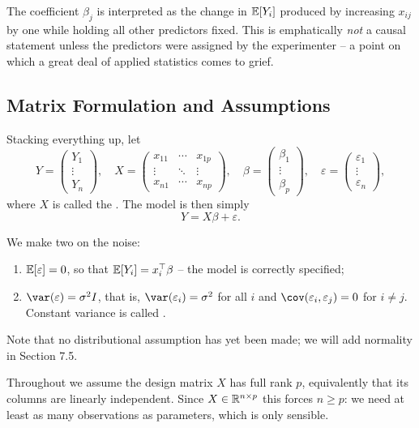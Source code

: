 \documentclass[a4paper]{scrartcl}
\begin{document}
The coefficient $\beta_j$ is interpreted as the change in $\mathbb{E}[Y_i]$ produced by increasing $x_{ij}$ by one while holding all other predictors fixed. This is emphatically \emph{not} a causal statement unless the predictors were assigned by the experimenter -- a point on which a great deal of applied statistics comes to grief.

\subsection{Matrix Formulation and Assumptions}

Stacking everything up, let
$$
Y = \begin{pmatrix}Y_1\\\vdots\\Y_n\end{pmatrix},\quad
X = \begin{pmatrix}x_{11}&\cdots&x_{1p}\\\vdots&\ddots&\vdots\\x_{n1}&\cdots&x_{np}\end{pmatrix},\quad
\beta = \begin{pmatrix}\beta_1\\\vdots\\\beta_p\end{pmatrix},\quad
\varepsilon = \begin{pmatrix}\varepsilon_1\\\vdots\\\varepsilon_n\end{pmatrix},
$$
where $X$ is called the . The model is then simply
$$
Y = X\beta + \varepsilon.
$$

We make two  on the noise:
\begin{enumerate}[label=(\roman*)]
  \item $\mathbb{E}[\varepsilon] = 0$, so that $\mathbb{E}[Y_i] = x_i^\top\beta$ -- the model is correctly specified;
  \item $\var(\varepsilon) = \sigma^2 I$, that is, $\var(\varepsilon_i) = \sigma^2$ for all $i$ and $\cov(\varepsilon_i,\varepsilon_j) = 0$ for $i\neq j$. Constant variance is called .
\end{enumerate}
Note that no distributional assumption has yet been made; we will add normality in Section 7.5.

Throughout we assume the design matrix $X$ has full rank $p$, equivalently that its columns are linearly independent. Since $X \in \mathbb{R}^{n\times p}$ this forces $n \geq p$: we need at least as many observations as parameters, which is only sensible.
\end{document}
